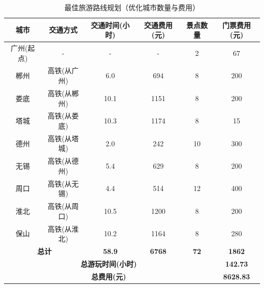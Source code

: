 \documentclass[withoutpreface,bwprint]{cumcmthesis} %
\begin{document}
\begin{table}[H]
  \centering
  \caption{最佳旅游路线规划（优化城市数量与费用）}
  \label{tab:最佳旅游路线规划（优化城市数量与费用）}
  \begin{tabular}{|c|c|c|c|c|c|}
    \hline
    \textbf{城市} & \textbf{交通方式} & \textbf{交通时间(小时)} & \textbf{交通费用(元)} & \textbf{景点数量} & \textbf{门票费用(元)} \\
    \hline
    广州(起点) & - & - & - & 2 & 67 \\
    \hline
    郴州 & 高铁(从广州) & 6.0 & 694 & 8 & 200 \\
    \hline
    娄底 & 高铁(从郴州) & 10.1 & 1151 & 8 & 200 \\
    \hline
    塔城 & 高铁(从娄底) & 10.3 & 1174 & 8 & 15 \\
    \hline
    德州 & 高铁(从塔城) & 2.0 & 242 & 10 & 300 \\
    \hline
    无锡 & 高铁(从德州) & 5.4 & 629 & 8 & 200 \\
    \hline
    周口 & 高铁(从无锡) & 4.4 & 514 & 12 & 400 \\
    \hline
    淮北 & 高铁(从周口) & 10.5 & 1200 & 8 & 200 \\
    \hline
    保山 & 高铁(从淮北) & 10.2 & 1164 & 8 & 280 \\
    \hline
    \multicolumn{2}{|c|}{\textbf{总计}} & \textbf{58.9} & \textbf{6768} & \textbf{72} & \textbf{1862} \\
    \hline
    \multicolumn{5}{|c|}{\textbf{总游玩时间(小时)}} & \textbf{142.73} \\
    \hline
    \multicolumn{5}{|c|}{\textbf{总费用(元)}} & \textbf{8628.83} \\
    \hline
  \end{tabular}
\end{table}
\end{document}
